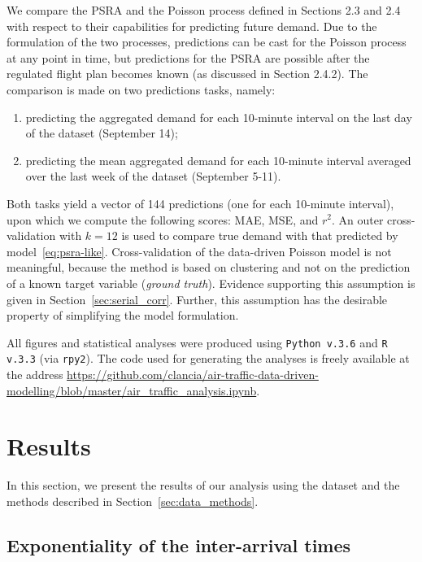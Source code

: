 \documentclass[draft,review]{elsarticle}
\begin{document}
We compare the \ac{PSRA} and the Poisson process defined in Sections 2.3 and 2.4 with respect to their capabilities for predicting future demand. Due to the formulation of the two processes, predictions can be cast for the Poisson process at any point in time, but predictions for the  \ac{PSRA} are possible after the regulated flight plan becomes known (as discussed in Section 2.4.2).
The comparison is made on two predictions tasks, namely:
\begin{enumerate}
  \item predicting the aggregated demand for each 10-minute interval on the last day of the dataset (September 14);
  \item predicting the mean aggregated demand for each 10-minute interval averaged over the last week of the dataset (September 5-11).
\end{enumerate}
Both tasks yield a vector of 144 predictions (one for each 10-minute interval), upon which we compute the following scores: \ac{MAE}, \ac{MSE}, and \(r^2\).
An outer cross-validation with $k = 12$ is used to compare true demand with that predicted by model~\eqref{eq:psra-like}.
Cross-validation of the data-driven Poisson model is not meaningful, because the method is based on clustering and not on the prediction of a known target variable (\emph{ground truth}).
Evidence supporting this assumption is given in Section~\ref{sec:serial_corr}.
Further, this assumption has the desirable property of simplifying the model formulation.

All figures and statistical analyses were produced using \texttt{Python v.3.6} and \texttt{R v.3.3} (via \texttt{rpy2}). The code used for generating the analyses is freely available at the address \url{https://github.com/clancia/air-traffic-data-driven-modelling/blob/master/air_traffic_analysis.ipynb}.

\section{Results}\label{sec:results}

In this section, we present the results of our analysis using the dataset and the methods described in Section~\ref{sec:data_methods}.

\subsection{Exponentiality of the inter-arrival times}\label{sec:exp}
\end{document}
